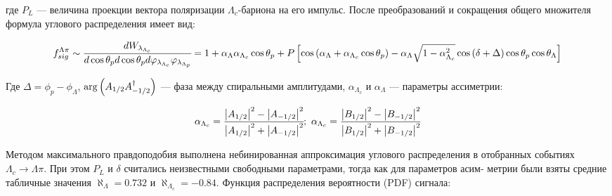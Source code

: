 где $P_L$ — величина проекции вектора поляризации $\Lambda_c$-бариона 
на его импульс. После преобразований и сокращения общего множителя формула
углового распределения имеет вид:

\begin{equation}
    f_{sig}^{\Lambda\pi} \sim \cfrac{dW_{\lambda_{\Lambda_{c}}}}{d\cos{\theta_p}d\cos{\theta_p}d\varphi_{\lambda_{\Lambda_{c}}}\varphi_{\lambda_{\Lambda_{p}}}} 
    =
    1 + \alpha_{\Lambda}\alpha_{\Lambda_c} \cos \theta_p + 
    P\left[ \cos\left( \alpha_{\Lambda} + \alpha_{\Lambda_c} \cos{\theta_p} \right) - 
    \alpha_{\Lambda}\sqrt{1 - \alpha_{\Lambda_c}^2}\cos\left( \delta + \Delta \right)\cos\theta_p \cos \theta_\Lambda \right]
\end{equation}

Где $\Delta = \phi_p - \phi_\Lambda$, 
$\arg\left( A_{1/2}A_{-1/2}^\dag \right)$ --- фаза между спиральными амплитудами,
$\alpha_{\Lambda_c}$ и $\alpha_{\Lambda}$ --- параметры ассиметрии:

\begin{equation}
    \alpha_{\Lambda_c} = \cfrac{\abs{A_{1/2}}^2 - \abs{A_{-1/2}}^2}{\abs{A_{1/2}}^2 + \abs{A_{-1/2}}^2}; \
    \alpha_{\Lambda_c} = \cfrac{\abs{B_{1/2}}^2 - \abs{B_{-1/2}}^2}{\abs{B_{1/2}}^2 + \abs{B_{-1/2}}^2}
\end{equation}

Методом максимального правдоподобия выполнена небинированная
аппроксимация углового распределения в отобранных событиях 
$\Lambda_c \to \Lambda \pi$. При этом $P_L$ и $\delta$ считались
неизвестными свободными параметрами, тогда как для параметров асим-
метрии были взяты средние табличные значения $\aleph_{\Lambda} = 0.732$ и $\aleph_{\Lambda_c} = -0.84$. 
Функция распределения вероятности (PDF) сигнала:





